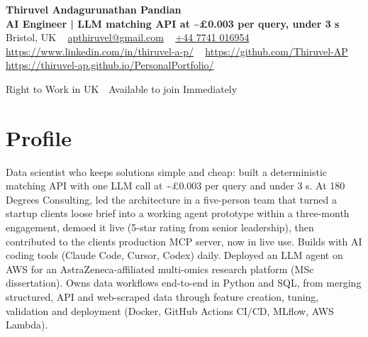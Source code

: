 \documentclass[a4paper,11pt]{article}
\newcommand{\num}[1]{\textbf{#1}}   %
\begin{document}
\begin{center}
  {\LARGE\bfseries Thiruvel Andagurunathan Pandian} \\[3pt]
  {\color{headernavy}\small\textbf{AI Engineer | LLM matching API at \textasciitilde{}\num{£0.003} per query, under 3 s}} \\[3pt]
  {\small
  Bristol, UK\nobreak\ \,\textbar\, \href{mailto:apthiruvel@gmail.com}{apthiruvel@gmail.com}\nobreak\ \,\textbar\, \href{tel:+447741016954}{+44 7741 016954}\nobreak\ \,\textbar\, \href{https://www.linkedin.com/in/thiruvel-a-p/}{https://www.linkedin.com/in/thiruvel-a-p/}\nobreak\ \,\textbar\, \href{https://github.com/Thiruvel-AP}{https://github.com/Thiruvel-AP}\nobreak\ \,\textbar\, \href{https://thiruvel-ap.github.io/PersonalPortfolio/}{https://thiruvel-ap.github.io/PersonalPortfolio/}}\par\vspace{4pt}
  \noindent{} Right to Work in UK \,\textbar\, Available to join Immediately
\end{center}

\section{Profile}
Data scientist who keeps solutions simple and cheap: built a deterministic matching API with one LLM call at \textasciitilde{}£0.003 per query and under 3 s. At 180 Degrees Consulting, led the architecture in a five-person team that turned a startup client\textquotesingle{}s loose brief into a working agent prototype within a three-month engagement, demoed it live (5-star rating from senior leadership), then contributed to the client\textquotesingle{}s production MCP server, now in live use. Builds with AI coding tools (Claude Code, Cursor, Codex) daily. Deployed an LLM agent on AWS for an AstraZeneca-affiliated multi-omics research platform (MSc dissertation). Owns data workflows end-to-end in Python and SQL, from merging structured, API and web-scraped data through feature creation, tuning, validation and deployment (Docker, GitHub Actions CI/CD, MLflow, AWS Lambda).
\end{document}
